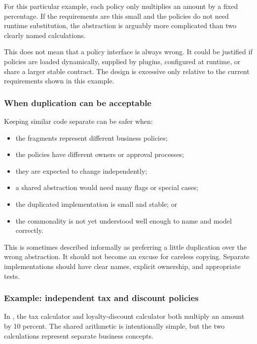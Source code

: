 \documentclass[12pt,a4paper]{article}
\begin{document}
For this particular example, each policy only multiplies an amount by a fixed percentage. If the requirements are this small and the policies do not need runtime substitution, the abstraction is arguably more complicated than two clearly named calculations.

This does not mean that a policy interface is always wrong. It could be justified if policies are loaded dynamically, supplied by plugins, configured at runtime, or share a larger stable contract. The design is excessive only relative to the current requirements shown in this example.

\subsubsection{When duplication can be acceptable}

Keeping similar code separate can be safer when:

\begin{itemize}

\item the fragments represent different business policies;

\item the policies have different owners or approval processes;

\item they are expected to change independently;

\item a shared abstraction would need many flags or special cases;

\item the duplicated implementation is small and stable; or

\item the commonality is not yet understood well enough to name and model correctly.

\end{itemize}

This is sometimes described informally as preferring a little duplication over the wrong abstraction. It should not become an excuse for careless copying. Separate implementations should have clear names, explicit ownership, and appropriate tests.

\subsubsection{Example: independent tax and discount policies}

In , the tax calculator and loyalty-discount calculator both multiply an amount by 10 percent. The shared arithmetic is intentionally simple, but the two calculations represent separate business concepts.
\end{document}
